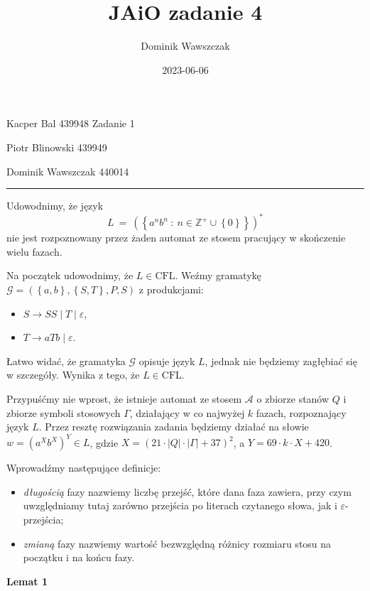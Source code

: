 \documentclass[12pt]{article}
\title{JAiO zadanie 4}
\author{Dominik Wawszczak}
\date{2023-06-06}
\begin{document}
	\setlength{\parindent}{0 cm}
	
	Kacper Bal 439948 \hfill Zadanie 1
	
	Piotr Blinowski 439949
	
	Dominik Wawszczak 440014
	
	\bigskip
	\hrule
	\bigskip
	
	Udowodnimy, że język
	\[ L \ = \ \left( \left\{ a^{n} b^{n} \ : \ n \in \mathbb{Z}^{+} \cup
	\left\{ 0 \right\} \right\} \right) ^ {\ast} \]
	nie jest rozpoznowany przez żaden automat ze stosem pracujący w skończenie
	wielu fazach.
	
	\medskip
	
	Na początek udowodnimy, że \(L \in \text{CFL}\). Weźmy gramatykę
	\(\mathcal{G} = \left( \left\{ a, b \right\}, \left\{ S, T \right\}, P, S
	\right)\) z produkcjami:
	\begin{itemize}
		\item \(S \longrightarrow SS \mid T \mid \varepsilon\),
		\item \(T \longrightarrow aTb \mid \varepsilon\).
	\end{itemize}
	Łatwo widać, że gramatyka \(\mathcal{G}\) opisuje język \(L\), jednak nie
	będziemy zagłębiać się w szczegóły. Wynika z tego, że \(L \in \text{CFL}\).
	
	\medskip
	
	Przypuśćmy nie wprost, że istnieje automat ze stosem \(\mathcal{A}\) o
	zbiorze stanów \(Q\) i zbiorze symboli stosowych \(\Gamma\), działający w co
	najwyżej \(k\) fazach, rozpoznający język \(L\). Przez resztę rozwiązania
	zadania będziemy działać na słowie \(w = \left( a^{X} b^{X} \right) ^ {Y}
	\in L\), gdzie \(X = \left( 21 \cdot \left| Q \right| \cdot \left| \Gamma
	\right| + 37 \right) ^ {2}\), a \(Y = 69 \cdot k \cdot X + 420\).
	
	\medskip
	
	Wprowadźmy następujące definicje:
	\begin{itemize}
		\item \textit{długością} fazy nazwiemy liczbę przejść, które dana faza
		      zawiera, przy czym uwzględniamy tutaj zarówno przejścia po
		      literach czytanego słowa, jak i \(\varepsilon\)-przejścia;
		\item \textit{zmianą} fazy nazwiemy wartość bezwzględną różnicy rozmiaru
		      stosu na początku i na końcu fazy.
	\end{itemize}
	
	\medskip
	
	\textbf{Lemat 1}
	
\end{document}
